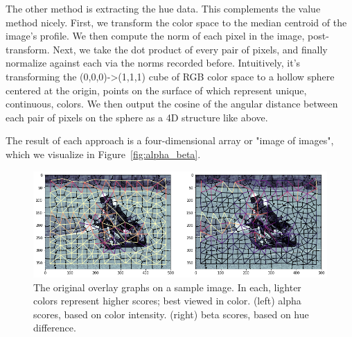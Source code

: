 \documentclass[twocolumn]{article}
\newcommand{\figref}[1]{Figure~\ref{fig:#1}}
\newcommand{\figlab}[1]{\label{fig:#1}}
\begin{document}
The other method is extracting the hue data. This complements the value method
nicely.  First, we transform the color space to the median centroid of the
image's profile. We then compute the norm of each pixel in the image,
post-transform.  Next, we take the dot product of every pair of pixels, and
finally normalize against each via the norms recorded before.  Intuitively, it's
transforming the (0,0,0)->(1,1,1) cube of RGB color space to a hollow sphere
centered at the origin, points on the surface of which represent unique,
continuous, colors. We then output the cosine of the angular distance between
each pair of pixels on the sphere as a 4D structure like above.

The result of each approach is a four-dimensional array or "image of
images", which we visualize in \figref{alpha_beta}.

\begin{figure}
  \centering
  \includegraphics[width=\linewidth]{figs/ab_graphs.png}

  \caption{
    The original overlay graphs on a sample image. In each, lighter colors represent higher scores; best viewed in color.
    (left) alpha scores, based on color intensity. (right) beta scores, based on hue difference.
  }
  \figlab{ab_graph}

\end{figure}
\end{document}
